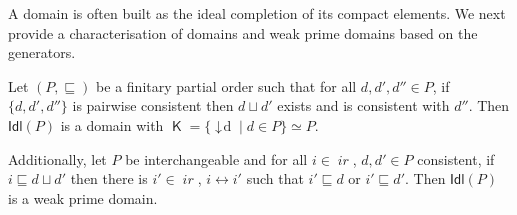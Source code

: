 \documentclass[conference]{IEEEtran}
\newcommand{\wi}{{interchangeable}}
\newcommand{\compact}[1]{\ensuremath{\mathop{\mathsf{K}({#1})}}}
\newcommand{\principal}[1]{\ensuremath{\mathop{\downarrow\!{#1}}}}
\newcommand{\ideal}[1]{\ensuremath{\mathsf{Idl}({#1})}}
\newcommand{\ir}[1]{\ensuremath{\mathop{\mathit{ir}({#1})}}}
\begin{document}
A domain is often built as the ideal completion of its compact
elements. We next provide a characterisation of domains and weak prime
domains based on the generators.

\begin{lemma}
\label{le:generators}
  Let $(P,\sqsubseteq)$ be a finitary partial order such that 
 for all $d, d', d'' \in P$, if
  $\{ d, d', d''\}$ is pairwise consistent then $d \sqcup d'$ exists
  and is consistent with $d''$. Then $\ideal{P}$ is a domain with
  $\compact{\ideal{P}} = \{ \principal{d} \mid d \in P \} \simeq P$.

  Additionally, let $P$ be {\wi} and for all $i \in \ir{P}$,
  $d, d' \in P$ consistent, if $i \sqsubseteq d \sqcup d'$ then there
  is $i' \in \ir{P}$, $i \leftrightarrow i'$ such that
  $i' \sqsubseteq d$ or $i' \sqsubseteq d'$. Then $\ideal{P}$ is a
  weak prime domain.
\end{lemma}
\end{document}
